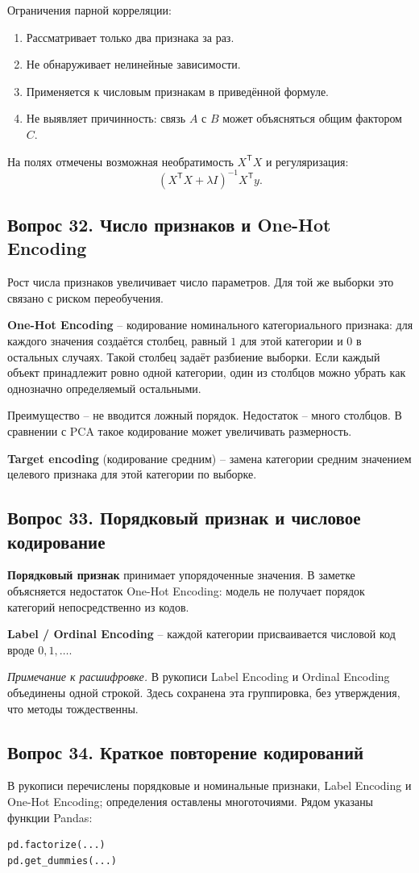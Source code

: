 \documentclass[11pt,a4paper]{article}
\newcommand{\ednote}[1]{\par{\small\color{muted}\textit{Примечание к расшифровке.} #1}\par}
\newcommand{\question}[2]{\subsection{Вопрос #1. #2}}
\begin{document}
Ограничения парной корреляции:
\begin{enumerate}
\item Рассматривает только два признака за раз.
\item Не обнаруживает нелинейные зависимости.
\item Применяется к числовым признакам в приведённой формуле.
\item Не выявляет причинность: связь $A$ с $B$ может объясняться общим фактором $C$.
\end{enumerate}

На полях отмечены возможная необратимость $X^\mathsf T X$ и регуляризация:
\[
 (X^\mathsf T X+\lambda I)^{-1}X^\mathsf T y.
\]

\question{32}{Число признаков и One-Hot Encoding}
Рост числа признаков увеличивает число параметров. Для той же выборки
это связано с риском переобучения.

\textbf{One-Hot Encoding} -- кодирование номинального категориального признака:
для каждого значения создаётся столбец, равный $1$ для этой категории
и $0$ в остальных случаях. Такой столбец задаёт разбиение выборки.
Если каждый объект принадлежит ровно одной категории, один из столбцов
можно убрать как однозначно определяемый остальными.

Преимущество -- не вводится ложный порядок. Недостаток -- много столбцов.
В сравнении с PCA такое кодирование может увеличивать размерность.

\textbf{Target encoding} (кодирование средним) -- замена категории средним
значением целевого признака для этой категории по выборке.

\question{33}{Порядковый признак и числовое кодирование}
\textbf{Порядковый признак} принимает упорядоченные значения.
В заметке объясняется недостаток One-Hot Encoding: модель не получает
порядок категорий непосредственно из кодов.

\textbf{Label / Ordinal Encoding} -- каждой категории присваивается числовой код
вроде $0,1,\ldots$.
\ednote{В рукописи Label Encoding и Ordinal Encoding объединены одной строкой.
Здесь сохранена эта группировка, без утверждения, что методы тождественны.}

\question{34}{Краткое повторение кодирований}
В рукописи перечислены порядковые и номинальные признаки,
Label Encoding и One-Hot Encoding; определения оставлены многоточиями.
Рядом указаны функции Pandas:
\begin{verbatim}
pd.factorize(...)
pd.get_dummies(...)
\end{verbatim}
\end{document}
